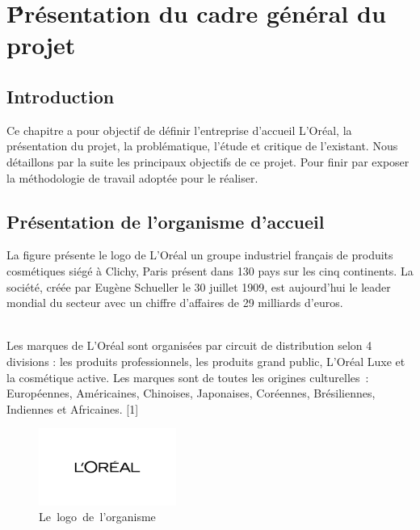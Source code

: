 \graphicspath{{./chapitres/chapitre1/figures/}}
\setcounter{mtc}{1}
\chapter{\'Présentation du cadre général du projet}
\minitoc
\newpage
\section*{Introduction}
Ce chapitre a pour objectif de définir l’entreprise d’accueil L’Oréal, la présentation du projet, la problématique, l’étude et critique de l’existant. Nous détaillons par la suite les principaux objectifs de ce projet. Pour finir par exposer la méthodologie de travail adoptée pour le réaliser.

\section{Présentation de l'organisme d'accueil}
La figure présente le logo de L’Oréal un groupe industriel français de produits cosmétiques siégé à Clichy, Paris présent dans 130 pays sur les cinq continents. La société, créée par Eugène Schueller le 30 juillet 1909, est aujourd'hui le leader mondial du secteur avec un chiffre d'affaires de 29 milliards d'euros.

\\ Les marques de L'Oréal sont organisées par circuit de distribution selon 4 divisions : les produits professionnels, les produits grand public, L'Oréal Luxe et la cosmétique active. Les marques sont de toutes les origines culturelles : Européennes, Américaines, Chinoises, Japonaises, Coréennes, Brésiliennes, Indiennes et Africaines. [1]

\begin{figure}[!ht]\centering
\includegraphics[width=0.4\textwidth]{chapitres/chapitre1/figures/big.jpeg}
\caption{Le\textcolor{white}{J}logo\textcolor{white}{J}de\textcolor{white}{J}l'organisme}
\label{fig:equalioslogo}
\end{figure}

